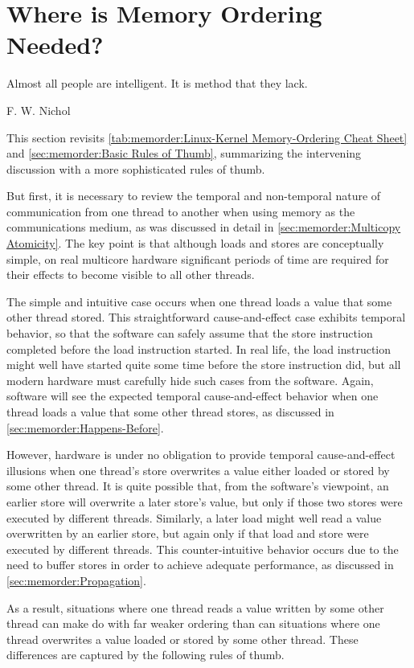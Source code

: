 \section{Where is Memory Ordering Needed?}
\label{sec:memorder:Where is Memory Ordering Needed?}
%
\epigraph{Almost all people are intelligent.
	  It is method that they lack.}
	 {F. W. Nichol}

This section revisits
\cref{tab:memorder:Linux-Kernel Memory-Ordering Cheat Sheet}
and \cref{sec:memorder:Basic Rules of Thumb},
summarizing the intervening discussion with a more sophisticated
rules of thumb.

But first, it is necessary to review the temporal and non-temporal
nature of communication from one thread to another when using memory
as the communications medium, as was discussed in detail in
\cref{sec:memorder:Multicopy Atomicity}.
The key point is that although loads and stores are conceptually simple,
on real multicore hardware significant periods of time are required for
their effects to become visible to all other threads.

The simple and intuitive case occurs when one thread loads a value that
some other thread stored.
This straightforward cause-and-effect case exhibits temporal behavior, so
that the software can safely assume that the store instruction completed
before the load instruction started.
In real life, the load instruction might well have started quite some
time before the store instruction did, but all modern hardware must
carefully hide such cases from the software.
Again, software will see the expected temporal cause-and-effect behavior
when one thread loads a value that some other thread stores, as discussed
in \cref{sec:memorder:Happens-Before}.

However, hardware is under no obligation to provide temporal
cause-and-effect illusions when one thread's store overwrites a value either
loaded or stored by some other thread.
It is quite possible that, from the software's viewpoint, an earlier store
will overwrite a later store's value, but only if those two stores were
executed by different threads.
Similarly, a later load might well read a value overwritten by an
earlier store, but again only if that load and store were executed by
different threads.
This counter-intuitive behavior occurs due to the need to buffer
stores in order to achieve adequate performance, as discussed in
\cref{sec:memorder:Propagation}.

As a result, situations where one thread reads a value written by some
other thread can make do with far weaker ordering than can situations
where one thread overwrites a value loaded or stored by some other thread.
These differences are captured by the following rules of thumb.

